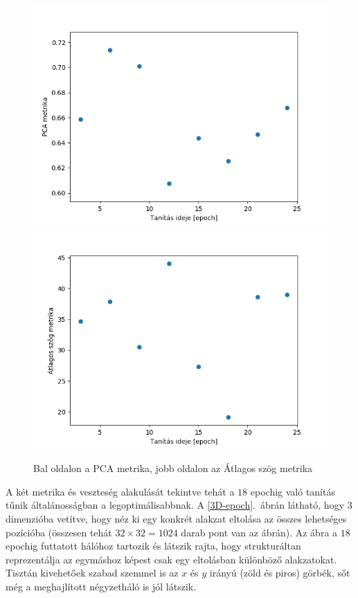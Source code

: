 \begin{figure}[h!]
  
  \includegraphics[width=0.5\linewidth]{metrics/vae_epoch-pca.png}
  \includegraphics[width=0.5\linewidth]{metrics/vae_epoch-as.png}
  \caption{Bal oldalon a PCA metrika, jobb oldalon az Átlagos szög metrika}\label{epoch-metrics}
\end{figure}

A két metrika és veszteség alakulását tekintve tehát a $18$ epochig való tanítás tűnik általánosságban a legoptimálisabbnak. A \ref{3D-epoch}.~ábrán látható, hogy $3$ dimenzióba vetítve, hogy néz ki egy konkrét alakzat eltolása az összes lehetséges pozícióba (összesen tehát $32\times32=1024$ darab pont van az ábrán). Az ábra a $18$ epochig futtatott hálóhoz tartozik és látszik rajta, hogy strukturáltan reprezentálja az egymáshoz képest csak egy eltolásban különböző alakzatokat. Tisztán kivehetőek szabad szemmel is az $x$ és $y$ irányú (zöld és piros) görbék, sőt még a meghajlított négyzetháló is jól látszik.

